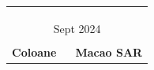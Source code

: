 \begin{titlepage}
\begin{textblock}{0}
\begin{center}
\begin{tabular}{c}
{\\
\\
\\

{\Large Sept 2024} \\ [5pt]
\hline\\[10pt]
\bf \LARGE Coloane~~~Macao SAR
\FloatBarrier


\end{tabular}
\end{center}
\end{textblock}















\end{titlepage}